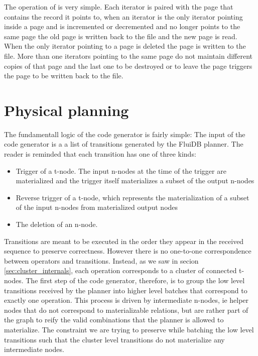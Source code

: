 The operation of  is very simple. Each iterator is paired
with the page that contains the record it points to, when an iterator
is the only iterator pointing inside a page and is incremented or
decremented and no longer points to the same page the old page is
written back to the file and the new page is read. When the only
iterator pointing to a page is deleted the page is written to the
file. More than one iterators pointing to the same page do not
maintain different copies of that page and the last one to be
destroyed or to leave the page triggers the page to be written back to
the file.
\section{Physical planning}

The fundamentall logic of the code generator is fairly simple: The
input of the code generator is a a list of transitions generated by
the FluiDB planner. The reader is reminded that each transition has
one of three kinds:

\begin{itemize}
\item Trigger of a t-node. The input n-nodes at the time of the trigger
are materialized and the trigger itself materializes a subset of the
output n-nodes
\item Reverse trigger of a t-node, which represents the
materialization of a subset of the input n-nodes from materialized
output nodes
\item The deletion of an n-node.
\end{itemize}

Transitions are meant to be executed in the order they appear in the
received sequence to preserve correctness. However there is no
one-to-one correspondence between operators and transitions. Instead,
as we saw in secion \ref{sec:cluster_internals}, each operation
corresponds to a cluster of connected t-nodes. The first step of the
code generator, therefore, is to group the low level transitions
received by the planner into higher level batches that correspond to
exactly one operation. This process is driven by intermediate n-nodes,
ie helper nodes that do not correspond to materializable relations,
but are rather part of the graph to reify the valid combinations that
the planner is allowed to materialize. The constraint we are trying to
preserve while batching the low level transitions such that the
cluster level transitions do not materialize any intermediate nodes.

